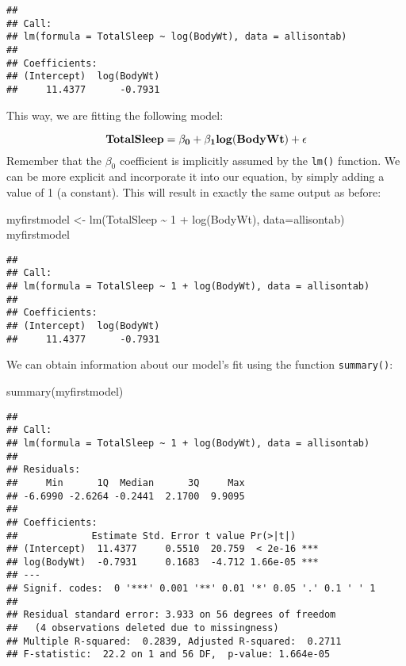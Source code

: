 \documentclass[
]{book}
\newenvironment{Shaded}{\begin{snugshade}}{\end{snugshade}}
\newcommand{\AttributeTok}[1]{\textcolor[rgb]{0.77,0.63,0.00}{#1}}
\newcommand{\DecValTok}[1]{\textcolor[rgb]{0.00,0.00,0.81}{#1}}
\newcommand{\FunctionTok}[1]{\textcolor[rgb]{0.00,0.00,0.00}{#1}}
\newcommand{\NormalTok}[1]{#1}
\newcommand{\OtherTok}[1]{\textcolor[rgb]{0.56,0.35,0.01}{#1}}
\newcommand{\SpecialCharTok}[1]{\textcolor[rgb]{0.00,0.00,0.00}{#1}}
\begin{document}
\begin{verbatim}
## 
## Call:
## lm(formula = TotalSleep ~ log(BodyWt), data = allisontab)
## 
## Coefficients:
## (Intercept)  log(BodyWt)  
##     11.4377      -0.7931
\end{verbatim}

This way, we are fitting the following model:

\[\bf{TotalSleep} = \beta_0 + \beta_1 \bf{log(BodyWt)} + \bf{\epsilon}\]
Remember that the \(\beta_0\) coefficient is implicitly assumed by the \texttt{lm()} function. We can be more explicit and incorporate it into our equation, by simply adding a value of 1 (a constant). This will result in exactly the same output as before:

\begin{Shaded}
\begin{Highlighting}[]
\NormalTok{myfirstmodel }\OtherTok{\textless{}{-}} \FunctionTok{lm}\NormalTok{(TotalSleep }\SpecialCharTok{\textasciitilde{}} \DecValTok{1} \SpecialCharTok{+} \FunctionTok{log}\NormalTok{(BodyWt), }\AttributeTok{data=}\NormalTok{allisontab)  }
\NormalTok{myfirstmodel}
\end{Highlighting}
\end{Shaded}

\begin{verbatim}
## 
## Call:
## lm(formula = TotalSleep ~ 1 + log(BodyWt), data = allisontab)
## 
## Coefficients:
## (Intercept)  log(BodyWt)  
##     11.4377      -0.7931
\end{verbatim}

We can obtain information about our model's fit using the function \texttt{summary()}:

\begin{Shaded}
\begin{Highlighting}[]
\FunctionTok{summary}\NormalTok{(myfirstmodel)}
\end{Highlighting}
\end{Shaded}

\begin{verbatim}
## 
## Call:
## lm(formula = TotalSleep ~ 1 + log(BodyWt), data = allisontab)
## 
## Residuals:
##     Min      1Q  Median      3Q     Max 
## -6.6990 -2.6264 -0.2441  2.1700  9.9095 
## 
## Coefficients:
##             Estimate Std. Error t value Pr(>|t|)    
## (Intercept)  11.4377     0.5510  20.759  < 2e-16 ***
## log(BodyWt)  -0.7931     0.1683  -4.712 1.66e-05 ***
## ---
## Signif. codes:  0 '***' 0.001 '**' 0.01 '*' 0.05 '.' 0.1 ' ' 1
## 
## Residual standard error: 3.933 on 56 degrees of freedom
##   (4 observations deleted due to missingness)
## Multiple R-squared:  0.2839, Adjusted R-squared:  0.2711 
## F-statistic:  22.2 on 1 and 56 DF,  p-value: 1.664e-05
\end{verbatim}
\end{document}
